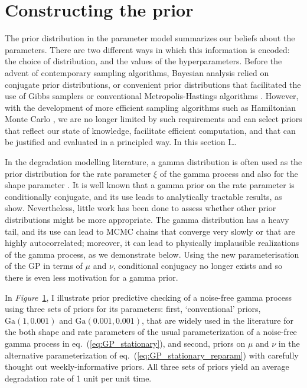 \section{Constructing the prior}

The prior distribution in the parameter model summarizes our beliefs about the parameters. There are two different ways in which this information is encoded: the choice of distribution, and the values of the hyperparameters. Before the advent of contemporary sampling algorithms, Bayesian analysis relied on conjugate prior distributions, or convenient prior distributions that facilitated the use of Gibbs samplers or conventional Metropolis-Hastings algorithms \citep{gilks1996markov}. However, with the development of more efficient sampling algorithms such as Hamiltonian Monte Carlo \citep{betancourt_conceptual_2017}, we are no longer limited by such requirements and can select priors that reflect our state of knowledge, facilitate efficient computation, and that can be justified and evaluated in a principled way. In this section I\ldots

In the degradation modelling literature, a gamma distribution is often used as the prior distribution for the rate parameter $\xi$ of the gamma process \citep{lawless_covariates_2004} and also for the shape parameter \citep{rodriguez-picon_degradation_2018}. It is well known that a gamma prior on the rate parameter is conditionally conjugate\citep{Pradhan_estimation_2011}, and its use leads to analytically tractable results, as \cite{lawless_covariates_2004} show. Nevertheless, little work has been done to assess whether other prior distributions might be more appropriate. The gamma distribution has a heavy tail, and its use can lead to MCMC chains that converge very slowly or that are highly autocorrelated; moreover, it can lead to physically implausible realizations of the gamma process, as we demonstrate below. Using the new parameterisation of the GP in terms of $\mu$ and $\nu$, conditional conjugacy no longer exists and so there is even less motivation for a gamma prior.

In \textit{Figure}~\ref{}, I illustrate prior predictive checking of a noise-free gamma process using three sets of priors for its parameters: first, `conventional' priors, $\mbox{Ga}(1, 0.001)$ and $\mbox{Ga}(0.001, 0.001)$, that are widely used in the literature for the both shape and rate parameters of the usual parameterization of a noise-free gamma process in eq.~(\ref{eq:GP_stationary}), and second, priors on $\mu$ and $\nu$ in the alternative parameterization of eq.~(\ref{eq:GP_stationary_reparam}) with carefully thought out weekly-informative priors. All three sets of priors yield an average degradation rate of 1 unit per unit time. 


